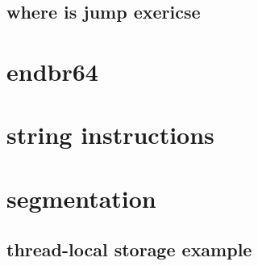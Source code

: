 

\subsection{where is jump exericse}



\section{endbr64}



\section{string instructions}


\section{segmentation}



\subsection{thread-local storage example}


